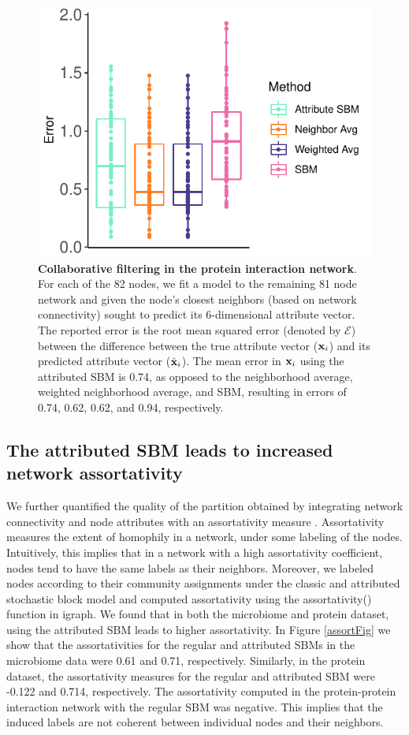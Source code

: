 \begin{figure}[h!]
\begin{center}
\includegraphics[width=.5\textwidth]{CollabSBM_Protein.pdf}
\caption{{\bf Collaborative filtering in the protein interaction network}. For each of the 82 nodes, we fit a model to the remaining 81 node network and given the node's closest  neighbors (based on network connectivity) sought to predict its 6-dimensional attribute vector. The reported error is the root mean squared error (denoted by $\mathcal{E}$) between the difference between the true attribute vector (${\bf x}_{i}$) and its predicted attribute vector (${\hat{\bf x}}_{i}$). The mean error in ${\bf x}_{i}$ using the attributed SBM is 0.74, as opposed to the neighborhood average, weighted neighborhood average, and SBM, resulting in errors of 0.74, 0.62, 0.62, and 0.94, respectively. }
\label{collabprotein}
\end{center}
\end{figure}

\subsection{The attributed SBM leads to increased network assortativity}

We further quantified the quality of the partition obtained by integrating network connectivity and node attributes with an assortativity measure \cite{assort}. Assortativity measures the extent of homophily in a network, under some labeling of the nodes. Intuitively, this implies that in a network with a high assortativity coefficient, nodes tend to have the same labels as their neighbors. Moreover, we labeled nodes according to their community assignments under the classic and attributed stochastic block model and computed assortativity using the assortativity() function in igraph. We found that in both the microbiome and protein dataset, using the attributed SBM leads to higher assortativity. In Figure \ref{assortFig} we show that the assortativities for the regular and attributed SBMs in the microbiome data were 0.61 and 0.71, respectively. Similarly, in the protein dataset, the assortativity measures for the regular and attributed SBM were -0.122 and 0.714, respectively. The assortativity computed in the protein-protein interaction network with the regular SBM was negative. This implies that the induced labels are not coherent between individual nodes and their neighbors. 

